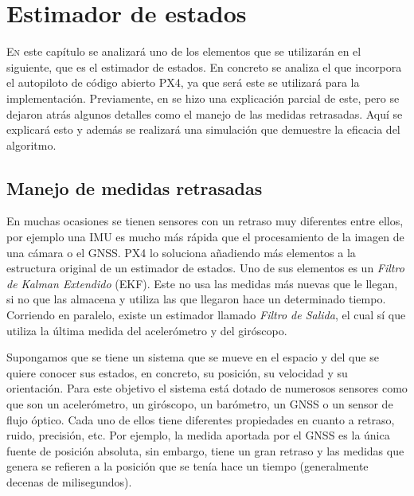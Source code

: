 \chapter{Estimador de estados}\label{chp:1}

\lettrine[lraise=-0.1, lines=2, loversize=0.2]{E}{n} este capítulo se analizará uno de los elementos que se utilizarán en el siguiente, que es el estimador de estados. En concreto se analiza el que incorpora el autopiloto de código abierto PX4, ya que será este se utilizará para la implementación. Previamente, en \cite{arias2019control} se hizo una explicación parcial de este, pero se dejaron atrás algunos detalles como el manejo de las medidas retrasadas. Aquí se explicará esto y además se realizará una simulación que demuestre la eficacia del algoritmo.

\section{Manejo de medidas retrasadas}
En muchas ocasiones se tienen sensores con un retraso muy diferentes entre ellos, por ejemplo una IMU es mucho más rápida que el procesamiento de la imagen de una cámara o el GNSS. PX4 lo soluciona añadiendo más elementos a la estructura original de un estimador de estados. Uno de sus elementos es un \textit{Filtro de Kalman Extendido} (EKF). Este no usa las medidas más nuevas que le llegan, si no que las almacena y utiliza las que llegaron hace un determinado tiempo. Corriendo en paralelo, existe un estimador llamado \textit{Filtro de Salida}, el cual sí que utiliza la última medida del acelerómetro y del giróscopo. 


Supongamos que se tiene un sistema que se mueve en el espacio y del que se quiere conocer sus estados, en concreto, su posición, su velocidad y su orientación. Para este objetivo el sistema está dotado de numerosos sensores como que son un acelerómetro, un giróscopo, un barómetro, un GNSS o un sensor de flujo óptico. Cada uno de ellos tiene diferentes propiedades en cuanto a retraso, ruido, precisión, etc. Por ejemplo, la medida aportada por el GNSS es la única fuente de posición absoluta, sin embargo, tiene un gran retraso y las medidas que genera se refieren a la posición que se tenía hace un tiempo (generalmente decenas de milisegundos). 

